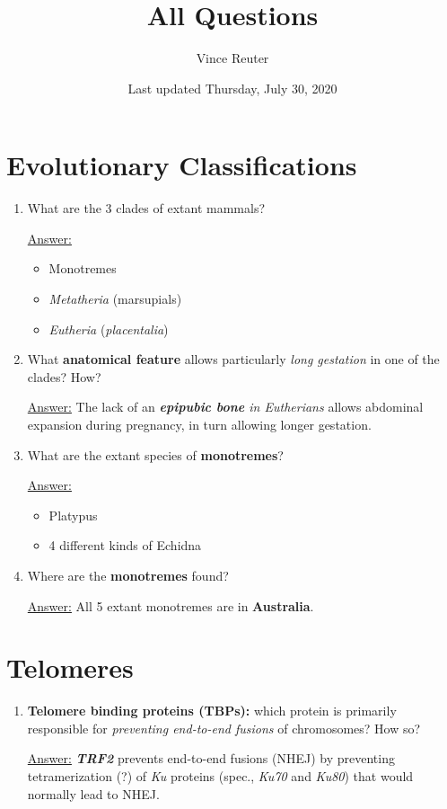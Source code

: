 \documentclass{article}
\title{All Questions}
\author{Vince Reuter}
\date{Last updated Thursday, July 30, 2020}
\newenvironment{QandA}{\begin{enumerate}[label=\bfseries Q\arabic*.]}
                       {\end{enumerate}}
\newenvironment{answered}{\par\normalfont\underline{Answer:}}{}
\begin{document}
\maketitle

\tableofcontents

\section{Evolutionary Classifications}
\begin{QandA}
  \item{What are the 3 clades of extant mammals?}
    \begin{answered}
    \begin{itemize}
      \item{Monotremes}
      \item{\textit{Metatheria} (marsupials)}
      \item{\textit{Eutheria} (\textit{placentalia})}
    \end{itemize}
    \end{answered}
  \item{What \textbf{anatomical feature} allows particularly \textit{long gestation} in one of the clades? How?}
    \begin{answered}
    The lack of an \textit{\textbf{epipubic bone} in Eutherians} allows abdominal expansion during pregnancy, in turn allowing longer gestation.
    \end{answered}
  \item{What are the extant species of \textbf{monotremes}?}
    \begin{answered}
    \begin{itemize}
      \item{Platypus}
      \item{4 different kinds of Echidna}
    \end{itemize}
    \end{answered}
  \item{Where are the \textbf{monotremes} found?}
    \begin{answered}
    All 5 extant monotremes are in \textbf{Australia}.
    \end{answered}
\end{QandA}
\section{Telomeres}
\begin{QandA}
  \item{\textbf{Telomere binding proteins (TBPs):} which protein is primarily responsible for \textit{preventing end-to-end fusions} of chromosomes? How so?}
    \begin{answered}
    \textbf{\textit{TRF2}} prevents end-to-end fusions (NHEJ) by preventing tetramerization (?) of \textit{Ku} proteins (spec., \textit{Ku70} and \textit{Ku80}) that would normally lead to NHEJ.
    \end{answered}
\end{QandA}
\end{document}
